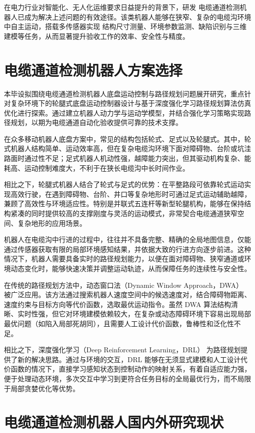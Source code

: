 \documentclass[
  oneside,
  degree=bachelor,
  fullwidthstop=false,
  fontset=fandol,
  times=false,
  minted=true,
  biblatex=true,
]{tongjithesis}
\begin{document}
在电力行业对智能化、无人化运维要求日益提升的背景下，研发 电缆通道检测机器人已成为解决上述问题的有效途径。该类机器人能够在狭窄、复杂的电缆沟环境中自主运动，搭载多传感器实现 结构尺寸测量、环境参数监测、缺陷识别与三维建模等任务，从而显著提升验收工作的效率、安全性与精度。

\section{电缆通道检测机器人方案选择}
本毕设拟围绕电缆通道检测机器人底盘运动控制与路径规划问题展开研究，重点针对复杂环境下的轮腿式底盘运动控制器设计与基于深度强化学习路径规划算法仿真优化进行探索。通过建立机器人动力学与运动学模型，并结合强化学习策略实现路径规划，以期为电缆通道自动化验收提供可靠的技术支撑。
    
在众多移动机器人底盘方案中，常见的结构包括轮式、足式以及轮腿式。其中，轮式机器人结构简单、运动效率高，但在复杂电缆沟环境下面对障碍物、台阶或坑洼路面时通过性不足；足式机器人机动性强，越障能力突出，但其驱动机构复杂、能耗高、运动控制难度大，不利于在狭长电缆沟中长时间作业。

相比之下，轮腿式机器人结合了轮式与足式的优势：在平整路段可依靠轮式运动实现高效行驶，在遇到障碍物、台阶、井口等复杂地形时可通过足式运动辅助越障，兼顾了高效性与环境适应性。特别是并联式五连杆等新型轮腿机构，能够在保持结构紧凑的同时提供较高的支撑刚度与灵活的运动模式，非常契合电缆通道狭窄空间、复杂地形的应用场景。

机器人在电缆沟中行进的过程中，往往并不具备完整、精确的全局地图信息，仅能通过传感器获取有限的局部环境感知结果，并依据大致的行进方向逐步前进。这种情况下，机器人需要具备实时的路径规划能力，以便在面对障碍物、狭窄通道或环境动态变化时，能够快速决策并调整运动轨迹，从而保障任务的连续性与安全性。

在传统的路径规划方法中，动态窗口法（Dynamic Window Approach，DWA） 被广泛应用。该方法通过搜索机器人速度空间中的候选速度对，结合障碍物距离、速度约束与目标方向等代价函数，选取最优运动指令。虽然 DWA 算法结构清晰、实时性强，但它对环境建模依赖较大，在复杂或动态障碍环境下容易出现局部最优问题（如陷入局部死胡同），且需要人工设计代价函数，鲁棒性和泛化性不足。

相比之下，深度强化学习（Deep Reinforcement Learning，DRL） 为路径规划提供了新的解决思路。通过与环境的交互，DRL 能够在无须显式建模和人工设计代价函数的情况下，直接学习感知状态到控制动作的映射关系，有着自适应能力强，便于处理动态环境，多次交互中学习到更符合任务目标的全局最优行为，而不局限于局部贪婪优化等优势。

\section{电缆通道检测机器人国内外研究现状}
\end{document}
